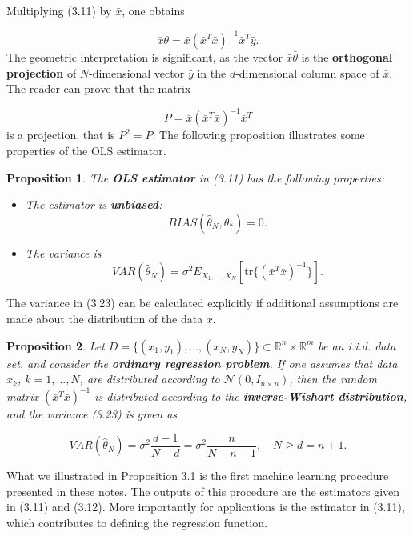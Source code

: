 \documentclass{report}
\newtheorem{proposition}{Proposition}[chapter]
\begin{document}
Multiplying (3.11) by $\bar{x}$, one obtains

\begin{equation}
\bar{x}\bar{\theta} = \bar{x}(\bar{x}^T\bar{x})^{-1}\bar{x}^T\bar{y}.
\end{equation}
The geometric interpretation is significant, as the vector $\bar{x}\bar{\theta}$ is the \textbf{orthogonal projection} of $N$-dimensional vector $\bar{y}$ in the $d$-dimensional column space of $\bar{x}$. The reader can prove that the matrix

\begin{equation}
P = \bar{x}(\bar{x}^T\bar{x})^{-1}\bar{x}^T
\end{equation}
is a projection, that is $P^2 = P$. The following proposition illustrates some properties of the OLS estimator.

\begin{proposition}
The \textbf{OLS estimator} in (3.11) has the following properties:

\begin{itemize}
\item The estimator is \textbf{unbiased}:
\begin{equation}
BIAS(\hat{\theta}_N, \theta_*) = 0.
\end{equation}
\item The variance is
\begin{equation}
VAR(\hat{\theta}_N) = \sigma^2 E_{X_1,\dots,X_N}[\mathrm{tr}\{(\bar{x}^T\bar{x})^{-1}\}].
\end{equation}
\end{itemize}
\end{proposition}
The variance in (3.23) can be calculated explicitly if additional assumptions are made about the distribution of the data $x$.

\begin{proposition}
Let $D = \{(x_1,y_1),\dots,(x_N,y_N)\} \subset \mathbb{R}^n \times \mathbb{R}^m$ be an i.i.d. data set, and consider the \textbf{ordinary regression problem}. If one assumes that data $x_k$, $k = 1, \dots, N$, are distributed according to $\mathcal{N}(0, I_{n\times n})$, then the random matrix $(\bar{x}^T\bar{x})^{-1}$ is distributed according to the \textbf{inverse-Wishart distribution}, and the variance (3.23) is given as

\begin{equation}
VAR(\hat{\theta}_N) = \sigma^2\frac{d - 1}{N - d} = \sigma^2\frac{n}{N - n - 1}, \quad  N \geq d = n + 1.
\end{equation}
\end{proposition}
What we illustrated in Proposition 3.1 is the first machine learning procedure presented in these notes. The outputs of this procedure are the estimators given in (3.11) and (3.12). More importantly for applications is the estimator in (3.11), which contributes to defining the regression function.
\end{document}
